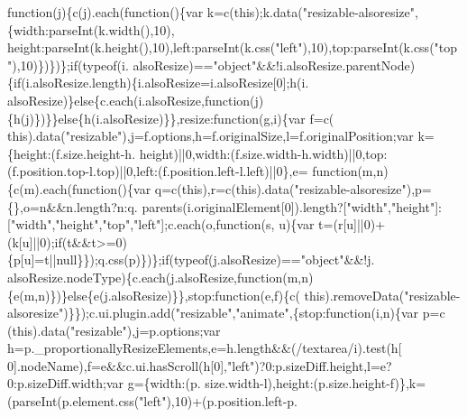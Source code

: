 \begin{DoxyCode}
{      function}(j)\{c(j).each(\textcolor{keyword}{function}()\{var k=c(\textcolor{keyword}{this});k.data(\textcolor{stringliteral}{"resizable-alsoresize"},\{width:parseInt(k.width(),10),
      height:parseInt(k.height(),10),left:parseInt(k.css(\textcolor{stringliteral}{"left"}),10),top:parseInt(k.css(\textcolor{stringliteral}{"top"}),10)\})\})\};\textcolor{keywordflow}{if}(typeof(i.
      alsoResize)==\textcolor{stringliteral}{"object"}&&!i.alsoResize.parentNode)\{\textcolor{keywordflow}{if}(i.alsoResize.length)\{i.alsoResize=i.alsoResize[0];h(i.
      alsoResize)\}\textcolor{keywordflow}{else}\{c.each(i.alsoResize,\textcolor{keyword}{function}(j)\{h(j)\})\}\}\textcolor{keywordflow}{else}\{h(i.alsoResize)\}\},resize:\textcolor{keyword}{function}(g,i)\{var f=c(\textcolor{keyword}{
      this}).data(\textcolor{stringliteral}{"resizable"}),j=f.options,h=f.originalSize,l=f.originalPosition;var k=\{height:(f.size.height-h.
      height)||0,width:(f.size.width-h.width)||0,top:(f.position.top-l.top)||0,left:(f.position.left-l.left)||0\},e=\textcolor{keyword}{
      function}(m,n)\{c(m).each(\textcolor{keyword}{function}()\{var q=c(\textcolor{keyword}{this}),r=c(\textcolor{keyword}{this}).data(\textcolor{stringliteral}{"resizable-alsoresize"}),p=\{\},o=n&&n.length?n:q.
      parents(i.originalElement[0]).length?[\textcolor{stringliteral}{"width"},\textcolor{stringliteral}{"height"}]:[\textcolor{stringliteral}{"width"},\textcolor{stringliteral}{"height"},\textcolor{stringliteral}{"top"},\textcolor{stringliteral}{"left"}];c.each(o,\textcolor{keyword}{function}(s,
      u)\{var t=(r[u]||0)+(k[u]||0);\textcolor{keywordflow}{if}(t&&t>=0)\{p[u]=t||null\}\});q.css(p)\})\};\textcolor{keywordflow}{if}(typeof(j.alsoResize)==\textcolor{stringliteral}{"object"}&&!j.
      alsoResize.nodeType)\{c.each(j.alsoResize,\textcolor{keyword}{function}(m,n)\{e(m,n)\})\}\textcolor{keywordflow}{else}\{e(j.alsoResize)\}\},stop:\textcolor{keyword}{function}(e,f)\{c(\textcolor{keyword}{
      this}).removeData(\textcolor{stringliteral}{"resizable-alsoresize"})\}\});c.ui.plugin.add(\textcolor{stringliteral}{"resizable"},\textcolor{stringliteral}{"animate"},\{stop:\textcolor{keyword}{function}(i,n)\{var p=c
      (\textcolor{keyword}{this}).data(\textcolor{stringliteral}{"resizable"}),j=p.options;var h=p.\_proportionallyResizeElements,e=h.length&&(/textarea/i).test(h[
      0].nodeName),f=e&&c.ui.hasScroll(h[0],\textcolor{stringliteral}{"left"})?0:p.sizeDiff.height,l=e?0:p.sizeDiff.width;var g=\{width:(p.
      size.width-l),height:(p.size.height-f)\},k=(parseInt(p.element.css(\textcolor{stringliteral}{"left"}),10)+(p.position.left-p.

\end{DoxyCode}
